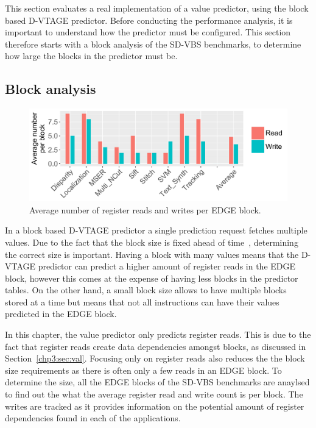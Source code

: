 This section evaluates a real implementation of a value predictor, using the block based D-VTAGE predictor.
Before conducting the performance analysis, it is important to understand how the predictor must be configured.
This section therefore starts with a block analysis of the SD-VBS benchmarks, to determine how large the blocks in the predictor must be.

\subsection{Block analysis}
\begin{figure}[t]
    \centering
    \includegraphics[width=1\textwidth]{chapter3/graphics/averageRegRead.pdf}

    \caption{Average number of register reads and writes per EDGE block.}
    \label{fig:edge_reg_read}
	\vspace{1em}
\end{figure}

In a block based D-VTAGE predictor a single prediction request fetches multiple values.
Due to the fact that the block size is fixed ahead of time~\cite{peraisBeBop2015}, determining the correct size is important.
Having a block with many values means that the D-VTAGE predictor can predict a higher amount of register reads in the EDGE block, however this comes at the expense of having less blocks in the predictor tables.
On the other hand, a small block size allows to have multiple blocks stored at a time but means that not all instructions can have their values predicted in the EDGE block.

In this chapter, the value predictor only predicts register reads.
This is due to the fact that register reads create data dependencies amongst blocks, as discussed in Section~\ref{chp3:sec:val}.
Focusing only on register reads also reduces the the block size requirements as there is often only a few reads in an EDGE block.
To determine the size, all the EDGE blocks of the SD-VBS benchmarks are anaylsed to find out the what the average register read and write count is per block.
The writes are tracked as it provides information on the potential amount of register dependencies found in each of the applications.

